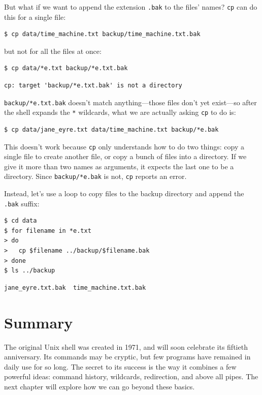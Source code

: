 \documentclass[
]{krantz}
\begin{document}
But what if we want to append the extension \texttt{.bak} to the files' names?
\texttt{cp} can do this for a single file:

\begin{verbatim}
$ cp data/time_machine.txt backup/time_machine.txt.bak
\end{verbatim}

but not for all the files at once:

\begin{verbatim}
$ cp data/*e.txt backup/*e.txt.bak
\end{verbatim}

\begin{verbatim}
cp: target 'backup/*e.txt.bak' is not a directory
\end{verbatim}

\texttt{backup/*e.txt.bak} doesn't match anything---those files don't yet exist---so
after the shell expands the \texttt{*} wildcards,
what we are actually asking \texttt{cp} to do is:

\begin{verbatim}
$ cp data/jane_eyre.txt data/time_machine.txt backup/*e.bak
\end{verbatim}

This doesn't work because \texttt{cp} only understands how to do two things:
copy a single file to create another file,
or copy a bunch of files into a directory.
If we give it more than two names as arguments,
it expects the last one to be a directory.
Since \texttt{backup/*e.bak} is not,
\texttt{cp} reports an error.

Instead,
let's use a loop to copy files to the backup directory
and append the \texttt{.bak} suffix:

\begin{verbatim}
$ cd data
$ for filename in *e.txt
> do
>   cp $filename ../backup/$filename.bak
> done
$ ls ../backup
\end{verbatim}

\begin{verbatim}
jane_eyre.txt.bak  time_machine.txt.bak
\end{verbatim}

\hypertarget{bash-basics-summary}{%
\section{Summary}\label{bash-basics-summary}}

The original Unix shell was created in 1971,
and will soon celebrate its fiftieth anniversary.
Its commands may be cryptic,
but few programs have remained in daily use for so long.
The secret to its success is the way it combines a few powerful ideas:
command history, wildcards, redirection, and above all pipes.
The next chapter will explore how we can go beyond these basics.
\end{document}
